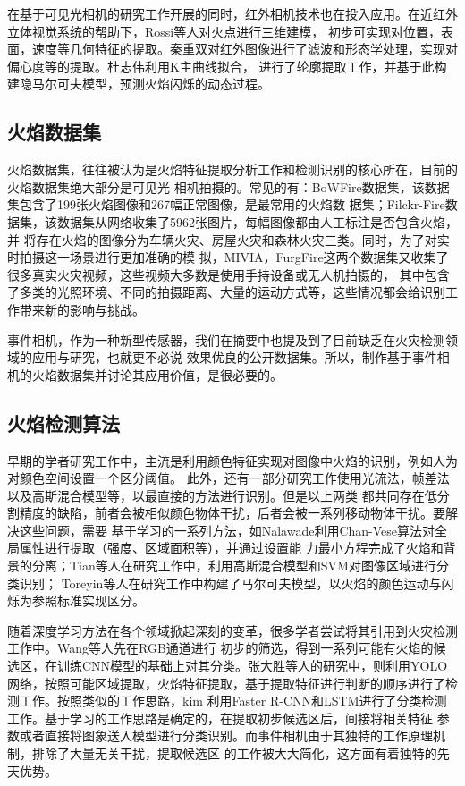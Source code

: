 在基于可见光相机的研究工作开展的同时，红外相机技术也在投入应用。在近红外立体视觉系统的帮助下，Rossi等人对火点进行三维建模，
初步可实现对位置，表面，速度等几何特征的提取。秦重双对红外图像进行了滤波和形态学处理，实现对偏心度等的提取。杜志伟利用K主曲线拟合，
进行了轮廓提取工作，并基于此构建隐马尔可夫模型，预测火焰闪烁的动态过程。

\subsection{火焰数据集}

火焰数据集，往往被认为是火焰特征提取分析工作和检测识别的核心所在，目前的火焰数据集绝大部分是可见光
相机拍摄的。常见的有：BoWFire数据集，该数据集包含了199张火焰图像和267幅正常图像，是最常用的火焰数
据集；Filckr-Fire数据集，该数据集从网络收集了5962张图片，每幅图像都由人工标注是否包含火焰，并
将存在火焰的图像分为车辆火灾、房屋火灾和森林火灾三类。同时，为了对实时拍摄这一场景进行更加准确的模
拟，MIVIA，FurgFire这两个数据集又收集了很多真实火灾视频，这些视频大多数是使用手持设备或无人机拍摄的，
其中包含了多类的光照环境、不同的拍摄距离、大量的运动方式等，这些情况都会给识别工作带来新的影响与挑战。

事件相机，作为一种新型传感器，我们在摘要中也提及到了目前缺乏在火灾检测领域的应用与研究，也就更不必说
效果优良的公开数据集。所以，制作基于事件相机的火焰数据集并讨论其应用价值，是很必要的。

\subsection{火焰检测算法}

早期的学者研究工作中，主流是利用颜色特征实现对图像中火焰的识别，例如人为对颜色空间设置一个区分阈值。
此外，还有一部分研究工作使用光流法，帧差法以及高斯混合模型等，以最直接的方法进行识别。但是以上两类
都共同存在低分割精度的缺陷，前者会被相似颜色物体干扰，后者会被一系列移动物体干扰。要解决这些问题，需要
基于学习的一系列方法，如Nalawade利用Chan-Vese算法对全局属性进行提取（强度、区域面积等），并通过设置能
力最小方程完成了火焰和背景的分离；Tian等人在研究工作中，利用高斯混合模型和SVM对图像区域进行分类识别；
Toreyin等人在研究工作中构建了马尔可夫模型，以火焰的颜色运动与闪烁为参照标准实现区分。

随着深度学习方法在各个领域掀起深刻的变革，很多学者尝试将其引用到火灾检测工作中。Wang等人先在RGB通道进行
初步的筛选，得到一系列可能有火焰的候选区，在训练CNN模型的基础上对其分类。张大胜等人的研究中，则利用YOLO
网络，按照可能区域提取，火焰特征提取，基于提取特征进行判断的顺序进行了检测工作。按照类似的工作思路，kim
利用Faster R-CNN和LSTM进行了分类检测工作。基于学习的工作思路是确定的，在提取初步候选区后，间接将相关特征
参数或者直接将图象送入模型进行分类识别。而事件相机由于其独特的工作原理机制，排除了大量无关干扰，提取候选区
的工作被大大简化，这方面有着独特的先天优势。


